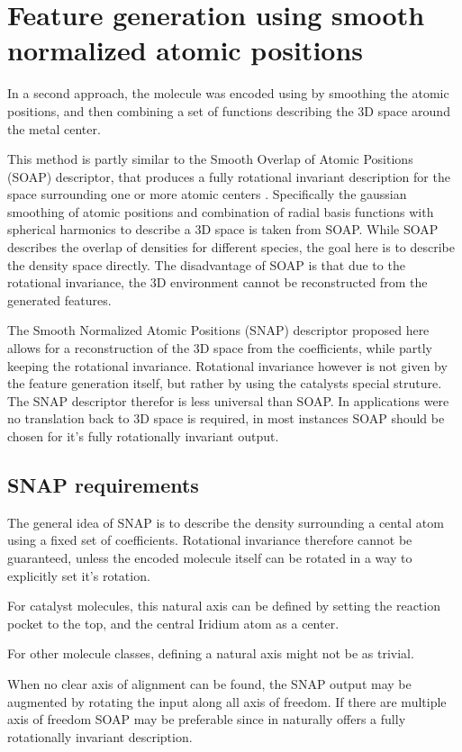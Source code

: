 \section{Feature generation using smooth normalized atomic positions}

In a second approach, the molecule was encoded using by smoothing the atomic positions, 
and then combining a set of functions describing the 3D space around the metal center.

This method is partly similar to the Smooth Overlap of Atomic Positions (SOAP) descriptor, that produces a 
fully rotational invariant description for the space surrounding one or more atomic centers \cite{Bart_k_2013}.
Specifically the gaussian smoothing of atomic positions and combination of radial basis functions with
spherical harmonics to describe a 3D space is taken from SOAP.
While SOAP describes the overlap of densities for different species, the goal here is to describe the density space directly.
The disadvantage of SOAP is that due to the rotational invariance, the 3D environment cannot be reconstructed from the generated features.

The Smooth Normalized Atomic Positions (SNAP) descriptor proposed here allows for a reconstruction of the 3D space from the coefficients, 
while partly keeping the rotational invariance.
Rotational invariance however is not given by the feature generation itself, but rather by using the catalysts special struture.
The SNAP descriptor therefor is less universal than SOAP. 
In applications were no translation back to 3D space is required,
in most instances SOAP should be chosen for it's fully rotationally invariant output.

\subsection{SNAP requirements}

The general idea of SNAP is to describe the density surrounding a cental atom using a fixed set of coefficients.
Rotational invariance therefore cannot be guaranteed, unless the encoded molecule itself can be rotated in a way to explicitly set it's rotation.

For catalyst molecules, this natural axis can be defined by setting the reaction pocket to the top, and the central Iridium atom as a center.

For other molecule classes, defining a natural axis might not be as trivial.

When no clear axis of alignment can be found, the SNAP output may be augmented by rotating the input along all axis of freedom.
If there are multiple axis of freedom SOAP may be preferable since in naturally offers a fully rotationally invariant description.

